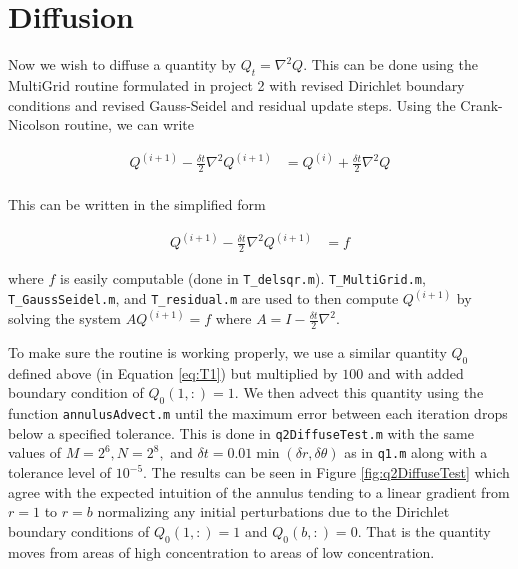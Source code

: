 \documentclass{article}
\begin{document}
\newpage
\section{Diffusion}

Now we wish to diffuse a quantity by $Q_t = \nabla^2 Q$. This can be done using the MultiGrid routine formulated in project 2 with revised Dirichlet boundary conditions and revised Gauss-Seidel and residual update steps. Using the Crank-Nicolson routine, we can write

\begin{align}
	Q^{(i+1)} - \frac{\delta t}{2} \nabla^2 Q^{(i+1)} &= Q^{(i)} + \frac{\delta t}{2} \nabla^2 Q \\
\end{align}

This can be written in the simplified form

\begin{align*}
	Q^{(i+1)} - \frac{\delta t}{2} \nabla^2 Q^{(i+1)} &= f
\end{align*}

where $f$ is easily computable (done in \texttt{T\_delsqr.m}). \texttt{T\_MultiGrid.m}, \texttt{T\_GaussSeidel.m}, and \texttt{T\_residual.m} are used to then compute $Q^{(i+1)}$ by solving the system $A Q^{(i+1)} = f$ where $A = I - \frac{\delta t}{2} \nabla^2$. 

To make sure the routine is working properly, we use a similar quantity $Q_0$ defined above (in Equation \ref{eq:T1}) but multiplied by $100$ and with added boundary condition of $Q_0(1,:) = 1$. We then advect this quantity using the function \texttt{annulusAdvect.m} until the maximum error between each iteration drops below a specified tolerance. This is done in \texttt{q2DiffuseTest.m} with the same values of $M=2^6, N=2^8,$ and $\delta t = 0.01 \min(\delta r, \delta \theta) $ as in \texttt{q1.m} along with a tolerance level of $10^{-5}$. The results can be seen in Figure \ref{fig:q2DiffuseTest} which agree with the expected intuition of the annulus tending to a linear gradient from $r=1$ to $r=b$ normalizing any initial perturbations due to the Dirichlet boundary conditions of $Q_0(1,:) = 1$ and $Q_0(b,:) = 0$. That is the quantity moves from areas of high concentration to areas of low concentration.
\end{document}
